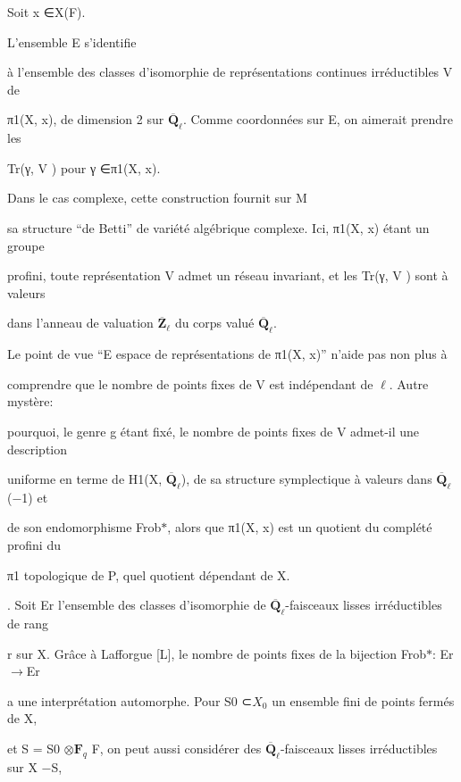 \documentclass[11pt]{article}
\begin{document}
\noindent Soit x ∈X(F).\par
\noindent L’ensemble E s’identifie\par
\noindent à l’ensemble des classes d’isomorphie de représentations continues irréductibles V de\par
\noindent π1(X, x), de dimension 2 sur \(\overline{\mathbf Q}_{\ell}\). Comme coordonnées sur E, on aimerait prendre les\par
\noindent Tr(γ, V ) pour γ ∈π1(X, x).\par
\noindent Dans le cas complexe, cette construction fournit sur M\par
\noindent sa structure “de Betti” de variété algébrique complexe. Ici, π1(X, x) étant un groupe\par
\noindent profini, toute représentation V admet un réseau invariant, et les Tr(γ, V ) sont à valeurs\par
\noindent dans l’anneau de valuation \(\overline{\mathbf Z}_{\ell}\) du corps valué \(\overline{\mathbf Q}_{\ell}\).\par
\noindent Le point de vue “E espace de représentations de π1(X, x)” n’aide pas non plus à\par
\noindent comprendre que le nombre de points fixes de V est indépendant de \(\ell\). Autre mystère:\par
\noindent pourquoi, le genre g étant fixé, le nombre de points fixes de V admet-il une description\par
\noindent uniforme en terme de H1(X, \(\overline{\mathbf Q}_{\ell}\)), de sa structure symplectique à valeurs dans \(\overline{\mathbf Q}_{\ell}\)(−1) et\par
\noindent de son endomorphisme Frob\(*\), alors que π1(X, x) est un quotient du complété profini du\par
\noindent π1 topologique de P, quel quotient dépendant de X.\par
{}. Soit Er l’ensemble des classes d’isomorphie de \(\overline{\mathbf Q}_{\ell}\)-faisceaux lisses irréductibles de rang\par
\noindent r sur X. Grâce à Lafforgue [L], le nombre de points fixes de la bijection Frob\(*\): Er \(\to\)Er\par
\noindent a une interprétation automorphe. Pour S0 ⊂\(X_0\) un ensemble fini de points fermés de X,\par
\noindent et S = S0 \(\otimes\)\(\mathbf F_q\) F, on peut aussi considérer des \(\overline{\mathbf Q}_{\ell}\)-faisceaux lisses irréductibles sur X −S,\par
\end{document}
